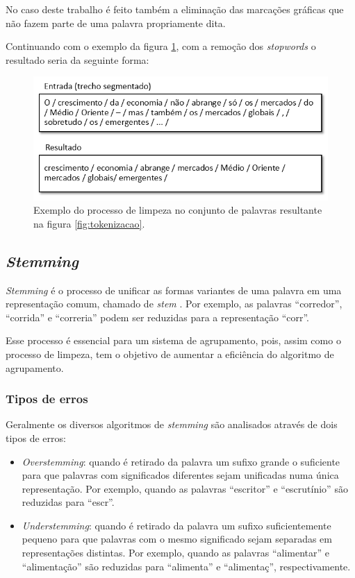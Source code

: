 \documentclass[a4paper,12pt]{article}
\begin{document}
No caso deste trabalho é feito também a eliminação das marcações gráficas que não fazem parte de uma palavra propriamente dita.

Continuando com o exemplo da figura \ref{fig:limpeza}, com a remoção dos \textit{stopwords} o resultado seria da seguinte forma:

\begin{figure}[H]
    \begin{center}
        \includegraphics[scale=0.6]{limpeza.png}
    \end{center}
    \caption{Exemplo do processo de limpeza no conjunto de palavras resultante na figura \ref{fig:tokenizacao}.}
    \label{fig:limpeza}
\end{figure}

\subsection {\textit{Stemming}}
\label {sec:stemming}

\textit{Stemming} é o processo de unificar as formas variantes de uma palavra em uma representação comum, chamado de \textit{stem} \cite{Orengo01}. Por exemplo, as palavras “corredor”, “corrida” e “correria” podem ser reduzidas para a representação “corr”.

Esse processo é essencial para um sistema de agrupamento, pois, assim como o processo de limpeza, tem o objetivo de aumentar a eficiência do algoritmo de agrupamento.

\subsubsection {Tipos de erros}
\label {sec:tipos_erros}

Geralmente os diversos algoritmos de \textit{stemming} são analisados através de dois tipos de erros:

\begin{itemize}
\item \textit{Overstemming}: quando é retirado da palavra um sufixo grande o suficiente para que palavras com significados diferentes sejam unificadas numa única representação. Por exemplo, quando as palavras “escritor” e “escrutínio” são reduzidas para “escr”.

\item \textit{Understemming}: quando é retirado da palavra um sufixo suficientemente pequeno para que palavras com o mesmo significado sejam separadas em representações distintas. Por exemplo, quando as palavras “alimentar” e “alimentação” são reduzidas para “alimenta” e “alimentaç”, respectivamente.
\end{itemize}
\end{document}
